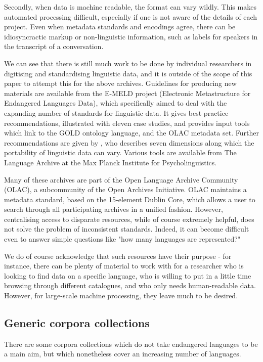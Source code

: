 Secondly, when data is machine readable, the format can vary wildly.  This makes automated processing difficult, especially if one is not aware of the details of each project.  Even when metadata standards and encodings agree, there can be idiosyncractic markup or non-linguistic information, such as labels for speakers in the transcript of a conversation.

We can see that there is still much work to be done by individual researchers in digitising and standardising linguistic data, and it is outside of the scope of this paper to attempt this for the above archives.  Guidelines for producing new materials are available from the E-MELD project (Electronic Metastructure for Endangered Languages Data), which specifically aimed to deal with the expanding number of standards for linguistic data.  It gives best practice recommendations, illustrated with eleven case studies, and provides input tools which link to the GOLD ontology language, and the OLAC metadata set.  Further recommendations are given by , who describes seven dimensions along which the portability of linguistic data can vary. Various tools are available from The Language Archive at the Max Planck Institute for Psycholinguistics.

Many of these archives are part of the Open Language Archive Community (OLAC), a subcommunity of the Open Archives Initiative.  OLAC maintains a metadata standard, based on the 15-element Dublin Core, which allows a user to search through all participating archives in a unified fashion.  However, centralising access to disparate resources, while of course extremely helpful, does not solve the problem of inconsistent standards.  Indeed, it can become difficult even to answer simple questions like "how many languages are represented?"

We do of course acknowledge that such resources have their purpose - for instance, there can be plenty of material to work with for a researcher who is looking to find data on a specific language, who is willing to put in a little time browsing through different catalogues, and who only needs human-readable data.  However, for large-scale machine processing, they leave much to be desired.


\subsection{Generic corpora collections}

There are some corpora collections which do not take endangered languages to be a main aim, but which nonetheless cover an increasing number of languages.

